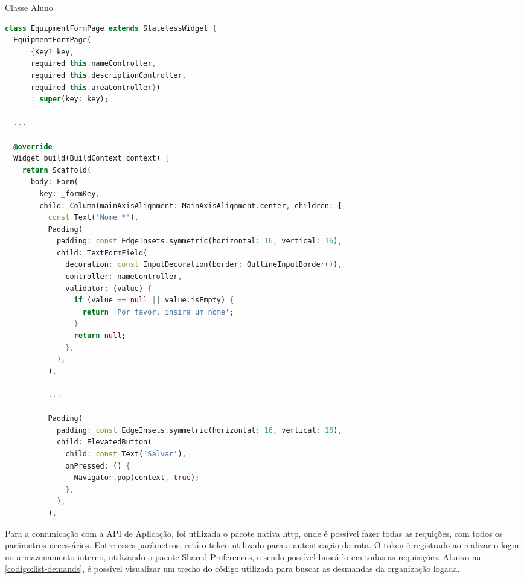 \begin{sourcecode}[htb]
    \caption{\label{codigo:equip-form}Classe Aluno}
    \begin{lstlisting}[frame=single, language=Dart]
class EquipmentFormPage extends StatelessWidget {
  EquipmentFormPage(
      {Key? key,
      required this.nameController,
      required this.descriptionController,
      required this.areaController})
      : super(key: key);

  ...

  @override
  Widget build(BuildContext context) {
    return Scaffold(
      body: Form(
        key: _formKey,
        child: Column(mainAxisAlignment: MainAxisAlignment.center, children: [
          const Text('Nome *'),
          Padding(
            padding: const EdgeInsets.symmetric(horizontal: 16, vertical: 16),
            child: TextFormField(
              decoration: const InputDecoration(border: OutlineInputBorder()),
              controller: nameController,
              validator: (value) {
                if (value == null || value.isEmpty) {
                  return 'Por favor, insira um nome';
                }
                return null;
              },
            ),
          ),
		  
          ...
		  
          Padding(
            padding: const EdgeInsets.symmetric(horizontal: 16, vertical: 16),
            child: ElevatedButton(
              child: const Text('Salvar'),
              onPressed: () {
                Navigator.pop(context, true);
              },
            ),
          ),

\end{lstlisting}
    \fonte{}
\end{sourcecode}

Para a comunicação com a API de Aplicação, foi utilizada o pacote nativa http, onde é possível fazer todas as requições, com todos os parâmetros necessários. Entre esses parâmetros, está o token utilizado para a autenticação da rota. O token é registrado ao realizar o login no armazenamento interno, utilizando o pacote Shared Preferences, e sendo possível buscá-lo em todas as requisições. Abaixo na \autoref{codigo:list-demands}, é possível visualizar um trecho do código utilizada para buscar as desmandas da organização logada.

